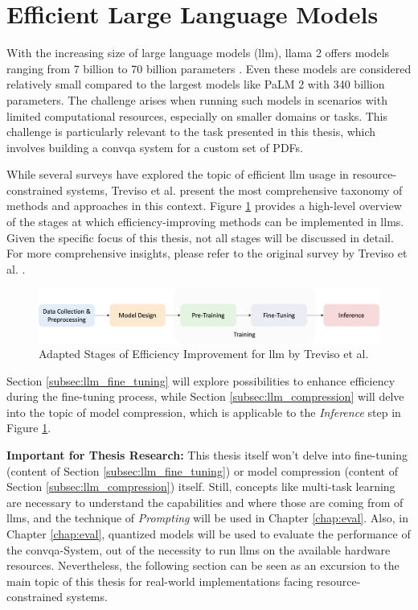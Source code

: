 \section{Efficient Large Language Models}
\label{sec:efficient_llm}

With the increasing size of large language models (\gls{llm}), \gls{llama} 2 offers models ranging from 7 billion to 70 billion parameters \cite{touvron_llama_2023}. Even these models are considered relatively small compared to the largest models like PaLM 2 \cite{anil_palm_2023} with 340 billion parameters. The challenge arises when running such models in scenarios with limited computational resources, especially on smaller domains or tasks. This challenge is particularly relevant to the task presented in this thesis, which involves building a \gls{convqa} system for a custom set of PDFs.

While several surveys \cite{ling_domain_2023, zhao_survey_2023} have explored the topic of efficient \gls{llm} usage in resource-constrained systems, Treviso et al. \cite{treviso_efficient_2023} present the most comprehensive taxonomy of methods and approaches in this context. Figure \ref{fig:llm_taxonomy} provides a high-level overview of the stages at which efficiency-improving methods can be implemented in \gls{llm}s. Given the specific focus of this thesis, not all stages will be discussed in detail. For more comprehensive insights, please refer to the original survey by Treviso et al. \cite{treviso_efficient_2023}.

\begin{figure}
    \centering
    \includegraphics[width=\textwidth]{Grafiken/Efficient_Survey_Steps.png}
    \caption{Adapted Stages of Efficiency Improvement for \gls{llm} by Treviso et al. \cite{treviso_efficient_2023}}
    \label{fig:llm_taxonomy}
\end{figure}

Section \ref{subsec:llm_fine_tuning} will explore possibilities to enhance efficiency during the fine-tuning process, while Section \ref{subsec:llm_compression} will delve into the topic of model compression, which is applicable to the \textit{Inference} step in Figure \ref{fig:llm_taxonomy}.

\textbf{Important for Thesis Research:} This thesis itself won't delve into fine-tuning (content of Section \ref{subsec:llm_fine_tuning}) or model compression (content of Section \ref{subsec:llm_compression}) itself. Still, concepts like multi-task learning are necessary to understand the capabilities and where those are coming from of \gls{llm}s, and the technique of \textit{Prompting} will be used in Chapter \ref{chap:eval}. Also, in Chapter \ref{chap:eval}, quantized models will be used to evaluate the performance of the \gls{convqa}-System, out of the necessity to run \gls{llm}s on the available hardware resources. Nevertheless, the following section can be seen as an excursion to the main topic of this thesis for real-world implementations facing resource-constrained systems.


